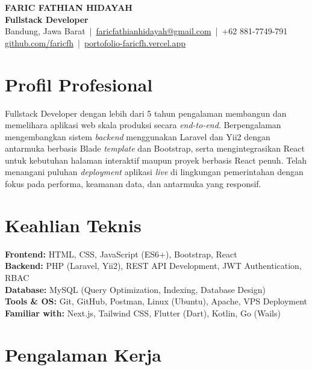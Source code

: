\documentclass[11pt,a4paper]{article}
\begin{document}
\begin{center}
  {\LARGE \textbf{FARIC FATHIAN HIDAYAH}}\\
  \vspace{4pt}
  \textbf{Fullstack Developer} \\
  \vspace{6pt}
  Bandung, Jawa Barat \,|\, 
  \href{mailto:faricfathianhidayah@gmail.com}{faricfathianhidayah@gmail.com} \,|\, 
  +62 881-7749-791 \\
  \href{https://github.com/faricfh}{github.com/faricfh} \,|\, 
  \href{https://portofolio-faricfh.vercel.app}{portofolio-faricfh.vercel.app}
\end{center}

\section*{Profil Profesional}
Fullstack Developer dengan lebih dari 5 tahun pengalaman membangun dan memelihara aplikasi web skala produksi secara \textit{end-to-end}. 
Berpengalaman mengembangkan sistem \textit{backend} menggunakan Laravel dan Yii2 dengan antarmuka berbasis Blade \textit{template} dan Bootstrap, serta mengintegrasikan React untuk kebutuhan halaman interaktif maupun proyek berbasis React penuh. 
Telah menangani puluhan \textit{deployment} aplikasi \textit{live} di lingkungan pemerintahan dengan fokus pada performa, keamanan data, dan antarmuka yang responsif.

\section*{Keahlian Teknis}
\textbf{Frontend:} HTML, CSS, JavaScript (ES6+), Bootstrap, React \\
\textbf{Backend:} PHP (Laravel, Yii2), REST API Development, JWT Authentication, RBAC \\
\textbf{Database:} MySQL (Query Optimization, Indexing, Database Design) \\
\textbf{Tools \& OS:} Git, GitHub, Postman, Linux (Ubuntu), Apache, VPS Deployment \\
\textbf{Familiar with:} Next.js, Tailwind CSS, Flutter (Dart), Kotlin, Go (Wails)

\section*{Pengalaman Kerja}
\end{document}
